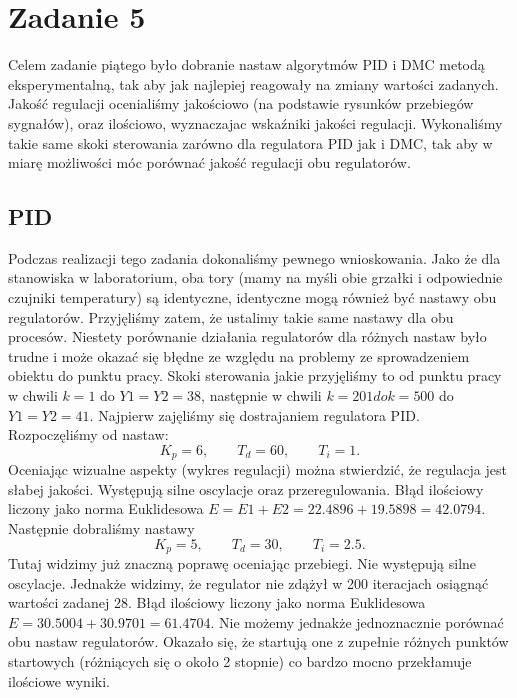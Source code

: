 \chapter{Zadanie 5}

Celem zadanie piątego było dobranie nastaw algorytmów PID i DMC metodą eksperymentalną, tak aby jak najlepiej reagowały na zmiany wartości zadanych. Jakość regulacji ocenialiśmy jakościowo (na podstawie rysunków przebiegów sygnałów), oraz ilościowo, wyznaczajac wskaźniki jakości regulacji. Wykonaliśmy takie same skoki sterowania zarówno dla regulatora PID jak i DMC, tak aby w miarę możliwości
móc porównać jakość regulacji obu regulatorów.
\section{PID}

Podczas realizacji tego zadania dokonaliśmy pewnego wnioskowania. Jako że dla stanowiska w laboratorium, oba tory (mamy na myśli
obie grzałki i odpowiednie czujniki temperatury) są identyczne, identyczne mogą również być nastawy obu regulatorów. Przyjęliśmy zatem, że ustalimy takie same nastawy dla obu procesów.
Niestety porównanie działania regulatorów dla różnych nastaw było trudne i może okazać się błędne ze względu na problemy ze sprowadzeniem obiektu
do punktu pracy. Skoki sterowania jakie przyjęliśmy to od punktu pracy w chwili $k = 1$ do $Y1 = Y2 = 38$, następnie w chwili $k = 201 do k = 500$ do $Y1 = Y2 = 41$.
Najpierw zajęliśmy się dostrajaniem regulatora PID. Rozpoczęliśmy od nastaw:
\begin{equation}
  K_p = 6, \qquad T_d = 60, \qquad T_i = 1.
\end{equation}
Oceniając wizualne aspekty (wykres regulacji) można stwierdzić, że regulacja jest słabej
jakości. Występują silne oscylacje oraz przeregulowania. Błąd ilościowy liczony jako norma Euklidesowa $E = E1 + E2 = 22.4896 + 19.5898 = 42.0794$. Następnie dobraliśmy nastawy
\begin{equation}
  K_p = 5, \qquad T_d = 30, \qquad T_i = 2.5.
\end{equation}
Tutaj widzimy już znaczną poprawę oceniając przebiegi. Nie występują silne oscylacje. Jednakże widzimy, że regulator nie zdążył w 200 iteracjach osiągnąć wartości zadanej 28. Błąd ilościowy liczony jako
norma Euklidesowa $E = 30.5004 + 30.9701= 61.4704$. Nie możemy jednakże jednoznacznie porównać obu nastaw regulatorów. Okazało się, że startują one z zupełnie różnych punktów startowych
(różniących się o około 2 stopnie) co bardzo mocno przekłamuje ilościowe wyniki.

